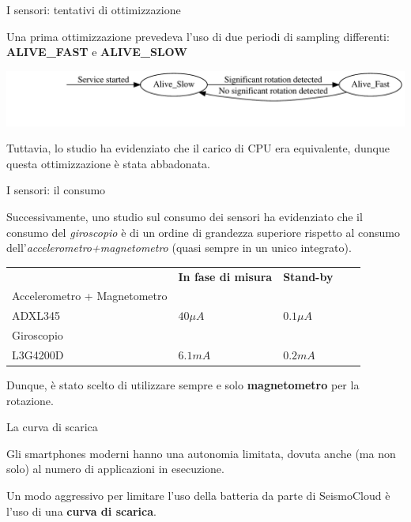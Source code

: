 \begin{frame}[c]{I sensori: tentativi di ottimizzazione}

Una prima ottimizzazione prevedeva l'uso di due periodi di sampling differenti: \textbf{ALIVE\_FAST} e \textbf{ALIVE\_SLOW}

\vspace{0.5cm}

\begin{center}
\includegraphics[width=\textwidth]{StateMachine4}
\end{center}

\vspace{0.5cm}

Tuttavia, lo studio ha evidenziato che il carico di CPU era equivalente, dunque questa ottimizzazione è stata abbadonata.

\end{frame}

\begin{frame}[c]{I sensori: il consumo}

Successivamente, uno studio sul consumo dei sensori ha evidenziato che il consumo del \textit{giroscopio} è di un ordine di grandezza superiore rispetto al consumo dell'\textit{accelerometro+magnetometro} (quasi sempre in un unico integrato).

\begin{table}[h]
\centering
\begin{tabular}{lllll}
& \textbf{In fase di misura} & \textbf{Stand-by} & \\
Accelerometro + Magnetometro \\
ADXL345 & $40 \mu A$ & $0.1 \mu A$ &  \\
Giroscopio \\
L3G4200D & $6.1mA$ & $0.2mA$ &
\end{tabular}
\end{table}

Dunque, è stato scelto di utilizzare sempre e solo \textbf{magnetometro} per la rotazione.

\end{frame}

\begin{frame}[c]{La curva di scarica}

Gli smartphones moderni hanno una autonomia limitata, dovuta anche (ma non solo) al numero di applicazioni in esecuzione.

\vspace{1cm}
Un modo aggressivo per limitare l'uso della batteria da parte di SeismoCloud è l'uso di una \textbf{curva di scarica}.

\end{frame}

